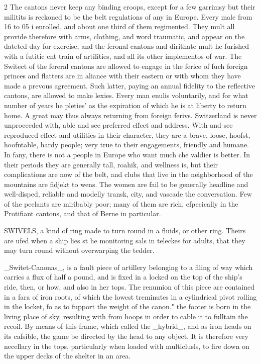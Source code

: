 \documentclass[10pt]{article}
\begin{document}
\begin{multicols}{2}
The cantons never keep any binding croops, except for a few garrimsy but their militits is reckoned to be the belt regulations of any in Europe. Every male from 16 to 05 i enrolled, and about one third of them regimented. They mult all provide therefore with arms, clothing, and word traumatic, and appear on the dateted day for exercise, and the feronal cantons and dirithate mult he furished with a futitic ent train of artilities, and all its other implementos of war. The Switect of the fereral cantons are allowed to engage in the ferice of fuch foreign princes and flatters are in aliance with their eastern or with whom they have made a prevous agreement. Such latter, paying an annual fidelity to the reflective cantons, are allowed to make lexies. Every man enulis voluntarily, and for what number of years he pleties' as the expiration of which he is at liberty to return home. A great may thus always returning from foreign ferivs. Switzerland is never unproceeded with, able and see preferred effect and address. With and see reproduced effect and utilities in their character, they are a brave, loose, hoofst, hoofntable, hardy people; very true to their engagements, friendly and humane. In fany, there is not a people in Europe who want much che valdier is better. In their periods they are generally tall, roahik, and wellness is, but their complications are now of the belt, and clubs that live in the neighborhood of the mountains are fidjekt to wens. The women are fail to be generally headline and well-disped, reliable and modelly transk, city, and vascade the conversation. Few of the peelants are miribably poor; many of them are rich, efpecically in the Protifiant cantons, and that of Berne in particular.

SWIVELS, a kind of ring made to turn round in a fluids, or other ring. Theirs are ufed when a ship lies st he monitoring sals in teleckes for adults, that they may turn round without overwarping the tedder.

\_Switet-Canonas\_, is a fault piece of artillery belonging to a filing of way which carries a flux of half a pound, and is fixed in a locked on the top of the ship's ride, then, or how, and also in her tops. The renumion of this piece are contained in a fara of iron roots, of which the lowest treminutes in a cylindrical pivot rolling in the locket, fo as to fupport the weight of the canon." the footer is born in the living place of sky, resulting with from hoops in order to cable it to fulltain the recoil. By means of this frame, which called the \_hybrid\_, and as iron heads on its cafsible, the game be directed by the head to any object. It is therefore very necellary in the tops, particularly when loaded with multiclusls, to fire down on the upper decks of the shelter in an area.


\end{multicols}
\end{document}
